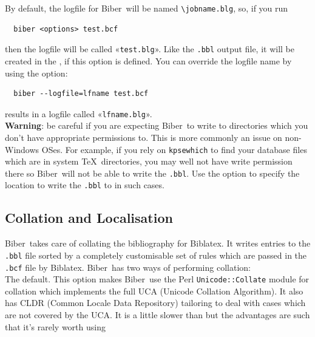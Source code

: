 \documentclass{ltxdockit}
\newcommand*{\biber}{Biber\xspace}
\newcommand*{\biblatex}{Biblatex\xspace}
\def\biberex#1{\hbox{\hspace{-4em}\texttt{\small \detokenize{#1}}}}
\begin{document}
By default, the logfile for \biber\ will be named \verb+\jobname.blg+,
so, if you run

\begin{verbatim}
  biber <options> test.bcf
\end{verbatim}

\noindent then the logfile will be called «\verb+test.blg+». Like the
\verb+.bbl+ output file, it will be created in the
, if this option is defined. You can
override the logfile name by using the  option:

\begin{verbatim}
  biber --logfile=lfname test.bcf
\end{verbatim}

\noindent results in a logfile called «\verb+lfname.blg+».\\

\noindent \textbf{Warning}: be careful if you are expecting \biber\ to
write to directories which you don't have appropriate permissions to. This
is more commonly an issue on non-Windows OSes. For example, if you rely on
\verb+kpsewhich+ to find your database files which are in system \TeX\
directories, you may well not have write permission there so \biber\
will not be able to write the \verb+.bbl+. Use the 
option to specify the location to write the \verb+.bbl+ to in such cases.

\subsection{Collation and Localisation}\label{coll}

\biber\ takes care of collating the bibliography for
\biblatex. It writes entries to the \verb+.bbl+ file sorted by a
completely customisable set of rules which are passed in the
\verb+.bcf+ file by \biblatex. \biber\ has two ways of performing
collation:\\[2ex]

\biberex{--collate|-C}
  \noindent The default. This option makes \biber\ use the Perl
  \verb+Unicode::Collate+ module for collation which implements the full UCA (Unicode
  Collation Algorithm). It also has CLDR (Common Locale Data
  Repository) tailoring to deal with cases which are not covered by the
  UCA. It is a little slower than  but the
  advantages are such that it's rarely worth using \opt{--fastsort|-f}\\[1ex]
\end{document}
